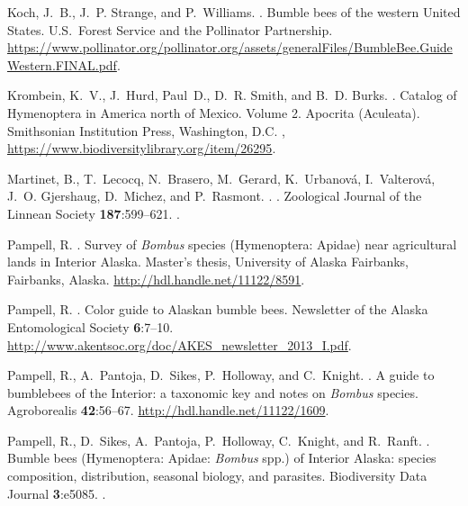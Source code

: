 \begin{multicols}{2}
\begin{thebibliography}{24}
Koch, J.~B., J.~P. Strange, and P.~Williams.
.
\newblock Bumble bees of the western United States.
\newblock U.S.\ Forest Service and the Pollinator Partnership.
\newblock
  \urlprefix\url{https://www.pollinator.org/pollinator.org/assets/generalFiles/BumbleBee.GuideWestern.FINAL.pdf}.

Krombein, K.~V., J.~Hurd, Paul~D., D.~R. Smith, and B.~D. Burks.
.
\newblock Catalog of Hymenoptera in America north of Mexico. Volume 2. Apocrita
  (Aculeata).
\newblock Smithsonian Institution Press, Washington, D.C.
\newblock {},
  \urlprefix\url{https://www.biodiversitylibrary.org/item/26295}.

Martinet, B., T.~Lecocq, N.~Brasero, M.~Gerard, K.~Urbanová, I.~Valterová,
  J.~O. Gjershaug, D.~Michez, and P.~Rasmont.
.
.
\newblock Zoological Journal of the Linnean Society {\bfseries 187}:599--621.
\newblock {}.

Pampell, R.
.
\newblock Survey of \textit{Bombus} species (Hymenoptera: Apidae) near
  agricultural lands in Interior Alaska.
\newblock Master's thesis, University of Alaska Fairbanks, Fairbanks, Alaska.
\newblock \urlprefix\url{http://hdl.handle.net/11122/8591}.

Pampell, R.
.
\newblock Color guide to Alaskan bumble bees.
\newblock Newsletter of the Alaska Entomological Society {\bfseries 6}:7--10.
\newblock
  \urlprefix\url{http://www.akentsoc.org/doc/AKES_newsletter_2013_I.pdf}.

Pampell, R., A.~Pantoja, D.~Sikes, P.~Holloway, and C.~Knight.
.
\newblock A guide to bumblebees of the Interior: a taxonomic key and notes on
  \textit{Bombus} species.
\newblock Agroborealis {\bfseries 42}:56--67.
\newblock \urlprefix\url{http://hdl.handle.net/11122/1609}.

Pampell, R., D.~Sikes, A.~Pantoja, P.~Holloway, C.~Knight, and R.~Ranft.
.
\newblock Bumble bees (Hymenoptera: Apidae: \textit{Bombus} spp.) of Interior
  Alaska: species composition, distribution, seasonal biology, and parasites.
\newblock Biodiversity Data Journal {\bfseries 3}:e5085.
\newblock {}.


\end{thebibliography}
\end{multicols}
